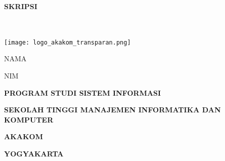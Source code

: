 \begin{center}
 \noindent
 {\Large \textbf{SKRIPSI}\\[1cm] }
 {\Large 
 	\textbf{\judulindo}\\[0.3cm]
	\textbf{\textit{\judulinggris}}\\[1cm]
 }
 \vspace{1cm}

 \texttt{[image: logo\_akakom\_transparan.png]}\\[2cm]

 \begin{minipage}[b]{0.75\linewidth}
 \begin{center} \normalsize

 \textsc{NAMA}
 
 \textsc{NIM}

 \end{center}
 \end{minipage}

 \vspace{6\baselineskip}
 {\textbf{PROGRAM STUDI SISTEM INFORMASI}
 
 \textbf{SEKOLAH TINGGI MANAJEMEN INFORMATIKA DAN KOMPUTER}
 
 \textbf{AKAKOM}
 
 \textbf{YOGYAKARTA}
 
 \the\year{}
 }
 \end{center}


